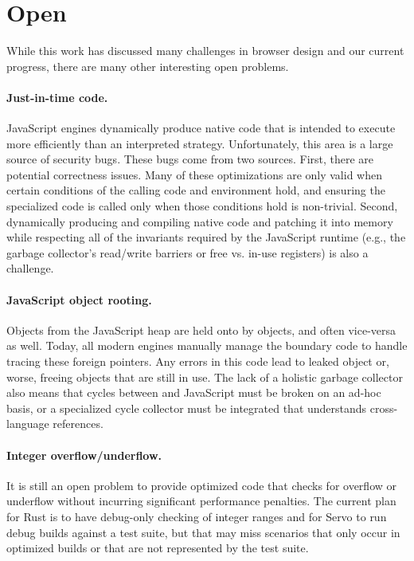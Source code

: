 
\section{Open}
\label{sec:open}
While this work has discussed many challenges in browser design and our current progress,
there are many other interesting open problems.

\paragraph{Just-in-time code.} JavaScript engines dynamically produce native code that is
intended to execute more efficiently than an interpreted strategy.
Unfortunately, this area is a large source of security bugs.
These bugs come from two sources.
First, there are potential correctness issues.
Many of these optimizations are only valid when certain conditions of the calling
code and environment hold, and ensuring the specialized code is called only when those
conditions hold is non-trivial.
Second, dynamically producing and compiling native code and patching it into memory
while respecting all of the invariants required by the JavaScript runtime (e.g., the
garbage collector's read/write barriers or free vs. in-use registers) is also a challenge.

\paragraph{JavaScript object rooting.} Objects from the JavaScript
heap are held onto by \Cplusplus{} objects, and often vice-versa as well.
Today, all modern engines manually manage the boundary code to handle tracing
these foreign pointers. Any errors in this code lead to leaked object or, worse,
freeing objects that are still in use.
The lack of a holistic garbage collector also means that cycles
between \Cplusplus{} and JavaScript must be broken on an ad-hoc basis, or
a specialized cycle collector must be integrated that understands cross-language
references.

\paragraph{Integer overflow/underflow.} It is still an open problem
to provide optimized code that checks for overflow or underflow without
incurring significant performance penalties.
The current plan for Rust is to have debug-only checking of integer ranges
and for Servo to run debug builds against a test suite, but that may miss
scenarios that only occur in optimized builds or that are not represented
by the test suite.

